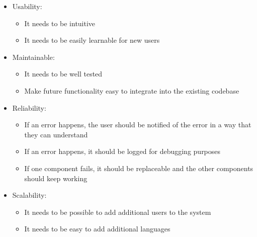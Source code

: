 \begin{itemize}
    \item Usability:
    \begin{itemize}
        \item It needs to be intuitive
        \item It needs to be easily learnable for new users
    \end{itemize}
    \item Maintainable:
    \begin{itemize}
        \item It needs to be well tested
        \item Make future functionality easy to integrate into the existing codebase
    \end{itemize}
    \item Reliability:
    \begin{itemize}
        \item If an error happens, the user should be notified of the error in a way that they can understand
        \item If an error happens, it should be logged for debugging purposes
        \item If one component fails, it should be replaceable and the other components should keep working
    \end{itemize}
    \item Scalability:
    \begin{itemize}
        \item It needs to be possible to add additional users to the system
        \item It needs to be easy to add additional languages
    \end{itemize}
\end{itemize}
